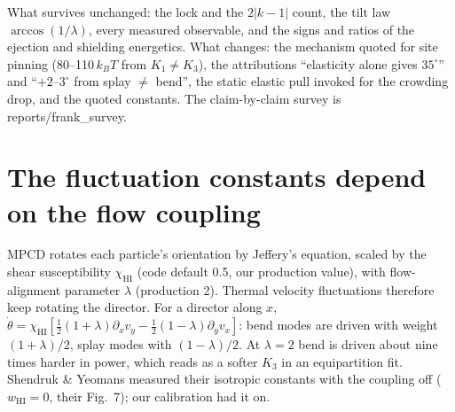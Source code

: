\documentclass[11pt,a4paper]{article}
\newcommand{\kT}{k_BT}\newcommand{\half}{\tfrac12}\newcommand{\la}{\ell_a}
\begin{document}
What survives unchanged: the lock and the $2|k-1|$ count, the tilt law $\arccos(1/\lambda)$, every measured observable, and the signs and ratios
of the ejection and shielding energetics. What changes: the mechanism quoted for site pinning (80--110\,$\kT$ from $K_1\neq K_3$), the
attributions ``elasticity alone gives $35^\circ$'' and ``$+2$--$3^\circ$ from splay $\neq$ bend'', the static elastic pull invoked for the crowding
drop, and the quoted constants. The claim-by-claim survey is reports/frank\_survey.

\section{The fluctuation constants depend on the flow coupling}
MPCD rotates each particle's orientation by Jeffery's equation, scaled by the shear susceptibility $\chi_\mathrm{HI}$ (code default 0.5, our
production value), with flow-alignment parameter $\lambda$ (production 2). Thermal velocity fluctuations therefore keep rotating the director.
For a director along $x$, $\dot\theta=\chi_\mathrm{HI}[\tfrac12(1+\lambda)\partial_xv_y-\tfrac12(1-\lambda)\partial_yv_x]$: bend modes are driven
with weight $(1+\lambda)/2$, splay modes with $(1-\lambda)/2$. At $\lambda=2$ bend is driven about nine times harder in power, which reads as a
softer $K_3$ in an equipartition fit. Shendruk \& Yeomans measured their isotropic constants with the coupling off ($w_\mathrm{HI}=0$, their
Fig.~7); our calibration had it on.
\end{document}

